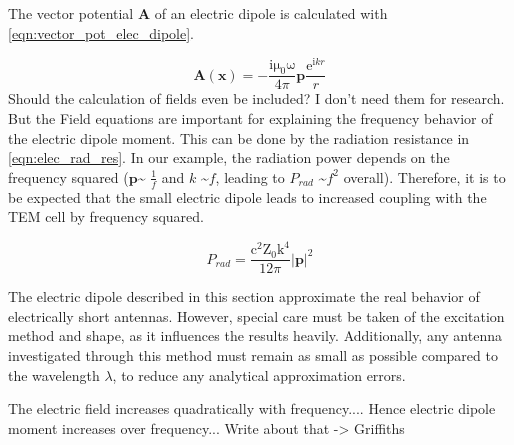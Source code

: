 The vector potential $\mathbf{A}$ of an electric dipole is calculated with \autoref{eqn:vector_pot_elec_dipole}\cite{Jackson}.

\begin{equation}
    \mathbf{A} (\mathbf{x})=-\frac{\mathrm{i\mu_0\omega}}{4\pi}\mathbf{p}\frac{\mathrm{e}^{\mathrm{i}kr}}{r}
    \label{eqn:vector_pot_elec_dipole}
\end{equation}
Should the calculation of fields even be included? I don't need them for research. But the Field equations are important for explaining the frequency behavior of the electric dipole moment. This can be done by the radiation resistance in \autoref{eqn:elec_rad_res}. In our example, the radiation power depends on the frequency squared ($\mathbf{p}$\textasciitilde
$\frac{1}{f}$ and $k$ \textasciitilde $f$, leading to $P_{rad}$ \textasciitilde $f^2$ overall)\cite{Jackson}. Therefore, it is to be expected that the small electric dipole leads to increased coupling with the TEM cell by frequency squared.

\begin{equation}
    P_{rad} = \frac{\mathrm{c}^2\mathrm{Z_0}\mathrm{k}^4}{12\pi}|\mathbf{p}|^2
    \label{eqn:elec_rad_res}
\end{equation}

The electric dipole described in this section approximate the real behavior of electrically short antennas. However, special care must be taken of the excitation method and shape, as it influences the results heavily\cite{Jackson}. Additionally, any antenna investigated through this method must remain as small as possible compared to the wavelength $\lambda$, to reduce any analytical approximation errors. 

The electric field increases quadratically with frequency.... Hence electric dipole moment increases over frequency... Write about that -> Griffiths



